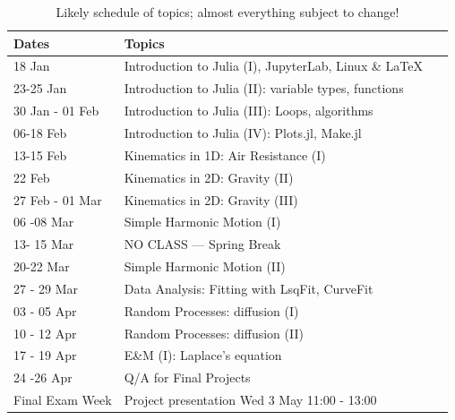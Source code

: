 \documentclass[justified]{tufte-handout}
\begin{document}
\begin{table}[h]
  \centering
  \selectfont
  \begin{tabular}{lll}  
    \toprule
    Dates &  Topics  \\
    \midrule
    18 Jan	         	& Introduction to Julia (I), JupyterLab, Linux \& \LaTeX\   \\
    23-25 Jan      	& Introduction to Julia (II): variable types, functions	\\    
   30 Jan - 01 Feb 	& Introduction to Julia (III): Loops, algorithms		 \\
    06-18 Feb      	& Introduction to Julia (IV): Plots.jl, Make.jl		\\
    13-15 Feb  		& Kinematics in 1D: Air Resistance (I)      			\\
    22 Feb		  	& Kinematics in 2D: Gravity (II)           			\\
   27 Feb - 01 Mar     	& Kinematics in 2D: Gravity (III)       				 \\
    06 -08 Mar      	& Simple Harmonic Motion (I)            			\\
    13- 15 Mar		& NO CLASS --- Spring Break 					\\
    20-22 Mar      	& Simple Harmonic Motion (II)           			\\
    27 - 29 Mar   	& Data Analysis: Fitting with LsqFit, CurveFit 		 \\
    03 - 05 Apr      	& Random Processes: diffusion (I)				\\
    10 - 12 Apr      	& Random Processes: diffusion	 (II)				\\
    17 - 19 Apr      	& E\&M (I): Laplace's equation					\\
    24 -26 Apr      	&Q/A for Final Projects	 					\\
    Final Exam Week & Project presentation Wed 3 May 11:00 - 13:00	\\
  \bottomrule
  \end{tabular}
  \caption{Likely schedule of topics; almost everything subject  to change!}
  \label{tab:normaltab}
\end{table}
\end{document}
